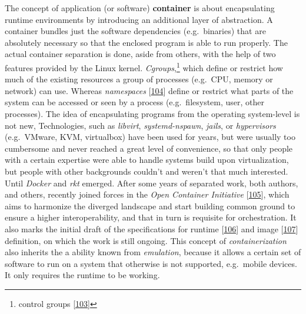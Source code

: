 \documentclass[12pt,english,a4paper,titlepage,cleardoublepage=empty,dottedtoc]{report}
\begin{document}
The concept of application (or software)
\textbf{\protect\hypertarget{link-container}{}{container}} is about
encapsulating runtime environments by introducing an additional layer of
abstraction. A container bundles just the software dependencies
(e.g.~binaries) that are absolutely necessary so that the enclosed
program is able to run properly. The actual container separation is
done, aside from others, with the help of two features provided by the
Linux kernel. \emph{Cgroups},\footnote{control groups
  {[}\protect\hyperlink{ref-web_2015_cgroup-doc}{103}{]}} which define
or restrict how much of the existing resources a group of processes
(e.g.~CPU, memory or network) can use. Whereas \emph{namespaces}
{[}\protect\hyperlink{ref-web_2016_kernel-namespace}{104}{]} define or
restrict what parts of the system can be accessed or seen by a process
(e.g.~filesystem, user, other processes). The idea of encapsulating
programs from the operating system-level is not new, Technologies, such
as \emph{libvirt}, \emph{systemd-nspawn}, \emph{jails}, or
\emph{hypervisors} (e.g.~VMware, KVM, virtualbox) have been used for
years, but were usually too cumbersome and never reached a great level
of convenience, so that only people with a certain expertise were able
to handle systems build upon virtualization, but people with other
backgrounds couldn't and weren't that much interested. Until
\emph{Docker} and \emph{rkt} emerged. After some years of separated
work, both authors, and others, recently joined forces in the \emph{Open
Container Initiative}
{[}\protect\hyperlink{ref-web_2016_open-container-initiative}{105}{]},
which aims to harmonize the diverged landscape and start building common
ground to ensure a higher interoperability, and that in turn is
requisite for orchestration. It also marks the initial draft of the
specifications for runtime
{[}\protect\hyperlink{ref-web_oci-spec_runtime}{106}{]} and image
{[}\protect\hyperlink{ref-web_oci-spec_image}{107}{]} definition, on
which the work is still ongoing. This concept of \emph{containerization}
also inherits the a ability known from \emph{emulation}, because it
allows a certain set of software to run on a system that otherwise is
not supported, e.g.~mobile devices. It only requires the runtime to be
working.
\end{document}
